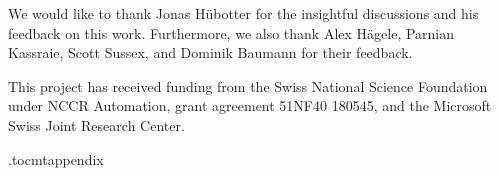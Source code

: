 \documentclass{article}
\begin{document}
\begin{abstract}
\end{abstract}








\clearpage
\begin{ack}
We would like to thank Jonas H\"ubotter for the insightful discussions and his feedback on this work. Furthermore, we also thank Alex Hägele, 
Parnian Kassraie, Scott Sussex, and Dominik Baumann for their feedback. 

This project has received funding from the Swiss National Science Foundation under NCCR Automation, grant agreement 51NF40 180545, and the Microsoft Swiss Joint Research Center.

\end{ack}









\newpage
\appendix

\renewcommand*\contentsname{Contents of Appendix}
\etocdepthtag.toc{mtappendix}
\tableofcontents
\end{document}
